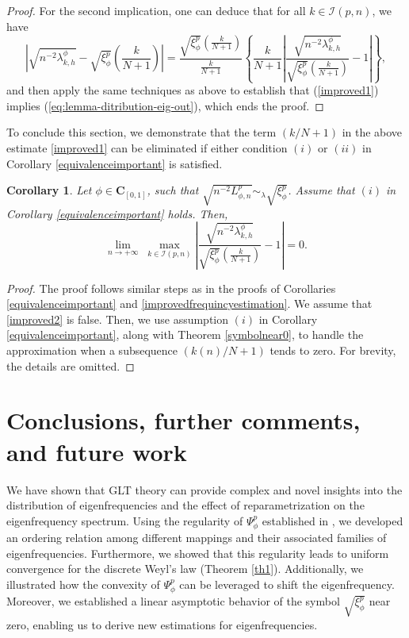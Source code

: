 \documentclass[11pt]{article}
\newtheorem{corollary}{Corollary}[section]
\begin{document}
\begin{proof}
For the second implication, one can deduce that for all $k\in \mathcal{I}(p,n)$, we have
$$
\left| \sqrt{n^{-2}\lambda^{\phi}_{k,h}}-\sqrt{\xi^p_{\phi}}\left(\frac{k}{N+1}\right)\right|=\frac{\sqrt{\xi^p_{\phi}}\left(\frac{k}{N+1}\right)}{\frac{k}{N+1}}\left\{\frac{k}{N+1}\left|\frac{\sqrt{n^{-2}\lambda^{\phi}_{k,h}}}{\sqrt{\xi^p_{\phi}}\left(\frac{k}{N+1}\right)}-1 \right|\right\},
$$
and then apply the same techniques as above to establish that  (\ref{improved1}) implies (\ref{eq:lemma-ditribution-eig-out}), which ends the proof. 
\end{proof}

To conclude this section, we demonstrate that the term $(k/N+1)$ in the above estimate \eqref{improved1} can be eliminated if either condition $(i)$ or $(ii)$ in Corollary \ref{equivalenceimportant} is satisfied.
\begin{corollary}\label{improvedf}
Let $\phi\in\mathbf{C}_{[0,1]}$, such that  $\sqrt{n^{-2}L_{\phi,n}^p}\sim_{\lambda} \sqrt{\xi^p_{\phi}}$. Assume that $(i)$ in Corollary \ref{equivalenceimportant} holds. Then,
 \begin{equation}\label{improved2}
        \lim_{n \rightarrow +\infty}\;\max_{k \in \mathcal{I}(p,n)} \left|\frac{\sqrt{n^{-2}\lambda^{\phi}_{k,h}}}{\sqrt{\xi^p_{\phi}}\left(\frac{k}{N+1}\right)}-1 \right|=0.
    \end{equation}
\end{corollary}
\begin{proof}
The proof follows similar steps as in the proofs of Corollaries \ref{equivalenceimportant} and \ref{improvedfrequincyestimation}. We assume that \eqref{improved2} is false. Then, we use assumption $(i)$ in Corollary \ref{equivalenceimportant}, along with Theorem \ref{symbolnear0}, to handle the approximation when a subsequence $(k(n)/N+1)$ tends to zero. For brevity, the details are omitted.
\end{proof}

\section{Conclusions, further comments, and future work}\label{sec:conclusions}
We have shown that GLT theory can provide complex and novel insights into the distribution of eigenfrequencies and the effect of reparametrization on the eigenfrequency spectrum. Using the regularity of $\Psi^p_{\phi}$ established in \cite{bianchi2018spectral}, we developed an ordering relation among different mappings and their associated families of eigenfrequencies. Furthermore, we showed that this regularity leads to uniform convergence for the discrete Weyl’s law (Theorem \ref{th1}). Additionally, we illustrated how the convexity of $\Psi^p_{\phi}$ can be leveraged to shift the eigenfrequency. Moreover, we established a linear asymptotic behavior of the symbol $\sqrt{\xi^p_{\phi}}$ near zero, enabling us to derive new estimations for eigenfrequencies.
\end{document}
